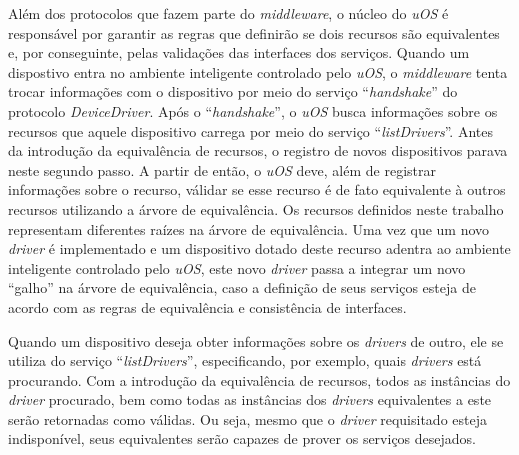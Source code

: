 Além dos protocolos que fazem parte do \emph{middleware}, o núcleo do \emph{uOS} é responsável por garantir as regras que definirão se dois recursos são equivalentes e, por conseguinte, pelas validações das interfaces dos serviços. Quando um dispostivo entra no ambiente inteligente controlado pelo \emph{uOS}, o \emph{middleware} tenta trocar informações com o dispositivo por meio do serviço ``\emph{handshake}'' do protocolo \emph{DeviceDriver}. Após o ``\emph{handshake}'', o \emph{uOS} busca informações sobre os recursos que aquele dispositivo carrega por meio do serviço ``\emph{listDrivers}''. Antes da introdução da equivalência de recursos, o registro de novos dispositivos parava neste segundo passo. A partir de então, o \emph{uOS} deve, além de registrar informações sobre o recurso, válidar se esse recurso é de fato equivalente à outros recursos utilizando a árvore de equivalência. Os recursos definidos neste trabalho representam diferentes raízes na árvore de equivalência. Uma vez que um novo \emph{driver} é implementado e um dispositivo dotado deste recurso adentra ao ambiente inteligente controlado pelo \emph{uOS}, este novo \emph{driver} passa a integrar um novo ``galho'' na árvore de equivalência, caso a definição de seus serviços esteja de acordo com as regras de equivalência e consistência de interfaces.

Quando um dispositivo deseja obter informações sobre os \emph{drivers} de outro, ele se utiliza do serviço ``\emph{listDrivers}'', especificando, por exemplo, quais \emph{drivers} está procurando. Com a introdução da equivalência de recursos, todos as instâncias do \emph{driver} procurado, bem como todas as instâncias dos \emph{drivers} equivalentes a este serão retornadas como válidas. Ou seja, mesmo que o \emph{driver} requisitado esteja indisponível, seus equivalentes serão capazes de prover os serviços desejados.